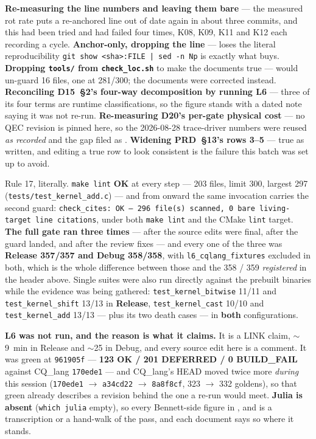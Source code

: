 \textbf{Re-measuring the line numbers and leaving them bare} --- the measured rot
rate puts a re-anchored line out of date again in about three commits, and this
had been tried and had failed four times, K08, K09, K11 and K12 each recording a
cycle. \textbf{Anchor-only, dropping the line} --- loses the literal
reproducibility \texttt{git show <sha>:FILE | sed -n Np} is exactly what buys.
\textbf{Dropping \texttt{tools/} from \texttt{check\_loc.sh}} to make the
documents true --- would un-guard 16 files, one at 281/300; the documents were
corrected instead. \textbf{Reconciling D15~§2's four-way decomposition by running
L6} --- three of its four terms are runtime classifications, so the figure stands
with a dated note saying it was not re-run. \textbf{Re-measuring D20's per-gate
physical cost} --- no QEC revision is pinned here, so the 2026-08-28 trace-driver
numbers were reused \emph{as recorded} and the gap filed as .
\textbf{Widening PRD~§13's rows 3--5} --- true as written, and editing a true row
to look consistent is the failure this batch was set up to avoid.

Rule 17, literally. \texttt{make lint} \textbf{OK} at every step --- 203 files,
limit 300, largest 297 (\texttt{tests/test\_kernel\_add.c}) --- and from
 onward the same invocation carries the second guard:
\texttt{check\_cites: OK --- 296 file(s) scanned, 0 bare living-target line
citations}, under both \texttt{make lint} and the CMake \texttt{lint} target.
\textbf{The full gate ran three times} --- after the source edits were final,
after the guard landed, and after the review fixes --- and every one of the three
was \textbf{Release 357/357 and Debug 358/358}, with
\texttt{l6\_cqlang\_fixtures} excluded in both, which is the whole difference
between those and the 358 / 359 \emph{registered} in the header above. Single
suites were also run directly against the prebuilt binaries while the evidence
was being gathered: \texttt{test\_kernel\_bitwise} 11/11 and
\texttt{test\_kernel\_shift} 13/13 in \textbf{Release},
\texttt{test\_kernel\_cast} 10/10 and \texttt{test\_kernel\_add} 13/13 --- plus
its two death cases --- in \textbf{both} configurations.

\medskip
\noindent\textbf{L6 was not run, and the reason is what it claims.} It is a LINK
claim, $\sim$9~min in Release and $\sim$25 in Debug, and every source edit here is
a comment. It was green at \texttt{961905f} --- \textbf{123 OK / 201 DEFERRED /
0 BUILD\_FAIL} against CQ\_lang \texttt{170ede1} --- and CQ\_lang's HEAD moved
twice more \emph{during} this session (\texttt{170ede1} $\to$ \texttt{a34cd22}
$\to$ \texttt{8a8f8cf}, 323 $\to$ 332 goldens), so that green already describes a
revision behind the one a re-run would meet.
\textbf{Julia is absent} (\texttt{which julia} empty), so every Bennett-side
figure in ,  and  is a transcription or a hand-walk
of the pass, and each document says so where it stands.

